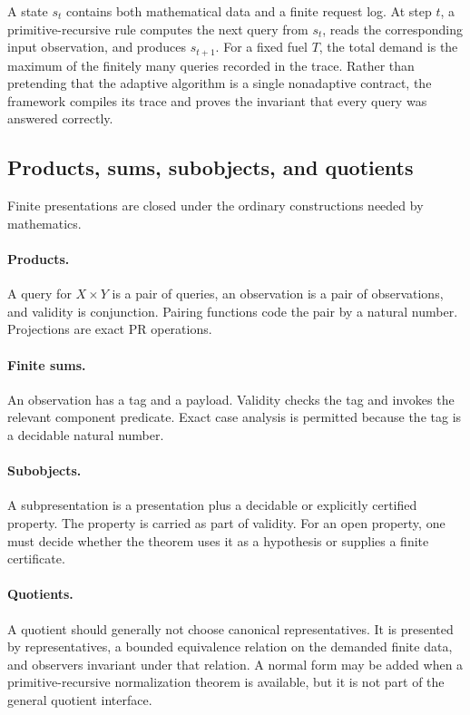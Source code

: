 A state \(s_t\) contains both mathematical data and a finite request log.  At
step \(t\), a primitive-recursive rule computes the next query from \(s_t\),
reads the corresponding input observation, and produces \(s_{t+1}\).  For a
fixed fuel \(T\), the total demand is the maximum of the finitely many queries
recorded in the trace.  Rather than pretending that the adaptive algorithm is a
single nonadaptive contract, the framework compiles its trace and proves the
invariant that every query was answered correctly.

\subsection{Products, sums, subobjects, and quotients}

Finite presentations are closed under the ordinary constructions needed by
mathematics.

\paragraph{Products.}
A query for \(X\times Y\) is a pair of queries, an observation is a pair of
observations, and validity is conjunction.  Pairing functions code the pair by
a natural number.  Projections are exact PR operations.

\paragraph{Finite sums.}
An observation has a tag and a payload.  Validity checks the tag and invokes
the relevant component predicate.  Exact case analysis is permitted because
the tag is a decidable natural number.

\paragraph{Subobjects.}
A subpresentation is a presentation plus a decidable or explicitly certified
property.  The property is carried as part of validity.  For an open property,
one must decide whether the theorem uses it as a hypothesis or supplies a
finite certificate.

\paragraph{Quotients.}
A quotient should generally not choose canonical representatives.  It is
presented by representatives, a bounded equivalence relation on the demanded
finite data, and observers invariant under that relation.  A normal form may be
added when a primitive-recursive normalization theorem is available, but it is
not part of the general quotient interface.

